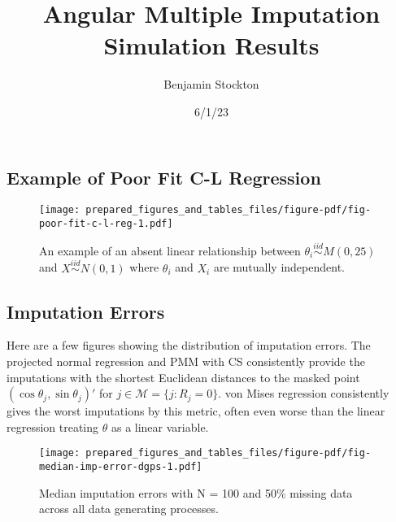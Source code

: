 \documentclass[
]{article}
\title{Angular Multiple Imputation Simulation Results}
\author{Benjamin Stockton}
\date{6/1/23}
\renewcommand*\contentsname{Table of contents}
\newcommand\contentsname{Table of contents}
\begin{document}
\maketitle
\ifdefined\Shaded\renewenvironment{Shaded}{\begin{tcolorbox}[interior hidden, sharp corners, breakable, boxrule=0pt, borderline west={3pt}{0pt}{shadecolor}, enhanced, frame hidden]}{\end{tcolorbox}}\fi

\renewcommand*\contentsname{Table of contents}
{
\hypersetup{linkcolor=}
\setcounter{tocdepth}{3}
\tableofcontents
}
\hypertarget{example-of-poor-fit-c-l-regression}{%
\subsection{Example of Poor Fit C-L
Regression}\label{example-of-poor-fit-c-l-regression}}

\begin{figure}

{\centering \texttt{[image: prepared\_figures\_and\_tables\_files/figure-pdf/fig-poor-fit-c-l-reg-1.pdf]}

}

\caption{\label{fig-poor-fit-c-l-reg}An example of an absent linear
relationship between \(\theta_i \overset{iid}{\sim} M(0, 25)\) and
\(X \overset{iid}{\sim} N(0,1)\) where \(\theta_i\) and \(X_i\) are
mutually independent.}

\end{figure}

\hypertarget{imputation-errors}{%
\subsection{Imputation Errors}\label{imputation-errors}}

Here are a few figures showing the distribution of imputation errors.
The projected normal regression and PMM with CS consistently provide the
imputations with the shortest Euclidean distances to the masked point
\((\cos\theta_j, \sin \theta_j)'\) for
\(j \in \mathcal{M} = \{j : R_j = 0\}.\) von Mises regression
consistently gives the worst imputations by this metric, often even
worse than the linear regression treating \(\theta\) as a linear
variable.

\begin{figure}

{\centering \texttt{[image: prepared\_figures\_and\_tables\_files/figure-pdf/fig-median-imp-error-dgps-1.pdf]}

}

\caption{\label{fig-median-imp-error-dgps}Median imputation errors with
N = 100 and 50\% missing data across all data generating processes.}

\end{figure}
\end{document}
